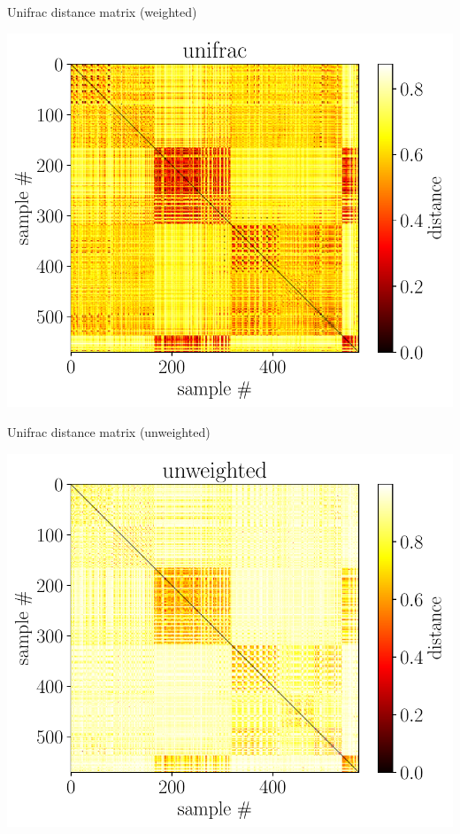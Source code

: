 \documentclass[
  ignorenonframetext,
]{beamer}
\begin{document}
\begin{frame}{Unifrac distance matrix (weighted)}
\protect\hypertarget{unifrac-distance-matrix-weighted}{}

\centering

\includegraphics[width=.9\linewidth]{figs/unifrac_distance_matrix}

\end{frame}

\begin{frame}{Unifrac distance matrix (unweighted)}
\protect\hypertarget{unifrac-distance-matrix-unweighted}{}

\centering

\includegraphics[width=.9\linewidth]{figs/unweighted_distance_matrix}

\end{frame}
\end{document}

